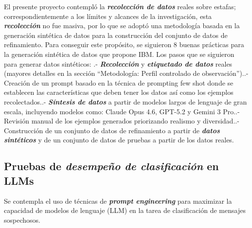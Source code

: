 El presente proyecto contempló la \textbf{\textit{recolección de datos}} reales sobre estafas; correspondientemente a los límites y alcances de la investigación, esta \textbf{\textit{recolección}} no fue masiva, por lo que se adoptó una metodología basada en la generación sintética de datos para la construcción del conjunto de datos de refinamiento.
Para conseguir este propósito, se siguieron 8 buenas prácticas para la generación sintética de datos que propone IBM. \cite{SynthDataByIbm} \linebreak \linebreak
Los pasos que se siguieron para generar datos sintéticos: .- \textbf{\textit{Recolección}} y \textbf{\textit{etiquetado de datos}} reales (mayores detalles en la sección “Metodología: Perfil controlado de observación”)..- Creación de un prompt basado en la técnica de prompting few shot donde se establecen las características que deben tener los datos así como los ejemplos recolectados..- \textbf{\textit{Síntesis de datos}} a partir de modelos largos de lenguaje de gran escala, incluyendo modelos como: Claude Opus 4.6, GPT-5.2 y Gemini 3 Pro..- Revisión manual de los ejemplos generados priorizando realismo y diversidad..- Construcción de un conjunto de datos de refinamiento a partir de \textbf{\textit{datos sintéticos}} y de un conjunto de datos de pruebas a partir de los datos reales.\linebreak


\subsection{Pruebas de \textbf{\textit{desempeño de clasificación}} en LLMs}

Se contempla el uso de técnicas de \textbf{\textit{prompt engineering}} para maximizar la capacidad de modelos de lenguaje (LLM) en la tarea de clasificación de mensajes sospechosos.

